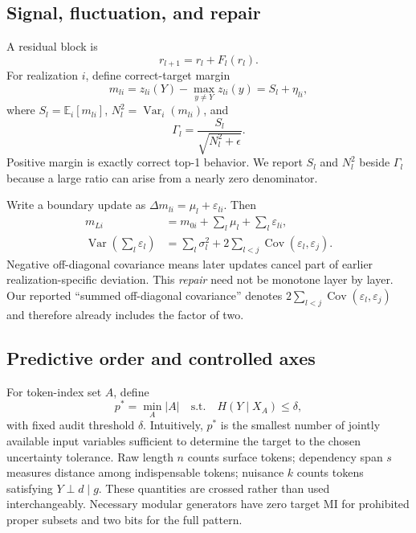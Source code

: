 \documentclass[10pt]{article}
\begin{document}
\subsection{Signal, fluctuation, and repair}
A residual block is
\begin{equation}r_{l+1}=r_l+F_l(r_l).
\end{equation}
For realization $i$, define correct-target margin
\begin{equation}m_{li}=z_{li}(Y)-\max_{y\ne Y}z_{li}(y)=S_l+\eta_{li},\end{equation}
where $S_l=\mathbb E_i[m_{li}]$, $N_l^2=\operatorname{Var}_i(m_{li})$, and
\begin{equation}\Gamma_l=\frac{S_l}{\sqrt{N_l^2+\epsilon}}.\end{equation}
Positive margin is exactly correct top-1 behavior. We report $S_l$ and $N_l^2$ beside $\Gamma_l$ because a large ratio can arise from a nearly zero denominator.

Write a boundary update as $\Delta m_{li}=\mu_l+\varepsilon_{li}$. Then
\begin{align}
m_{Li}&=m_{0i}+\sum_l\mu_l+\sum_l\varepsilon_{li},\\
\operatorname{Var}(\sum_l\varepsilon_l)&=\sum_l\sigma_l^2+2\sum_{l<j}\operatorname{Cov}(\varepsilon_l,\varepsilon_j).
\end{align}
Negative off-diagonal covariance means later updates cancel part of earlier realization-specific deviation. This \emph{repair} need not be monotone layer by layer. Our reported ``summed off-diagonal covariance'' denotes $2\sum_{l<j}\operatorname{Cov}(\varepsilon_l,\varepsilon_j)$ and therefore already includes the factor of two.

\subsection{Predictive order and controlled axes}
For token-index set $A$, define
\begin{equation}
p^*=\min_A |A|\quad\text{s.t.}\quad H(Y\mid X_A)\le\delta,
\end{equation}
with fixed audit threshold $\delta$. Intuitively, $p^*$ is the smallest number of jointly available input variables sufficient to determine the target to the chosen uncertainty tolerance. Raw length $n$ counts surface tokens; dependency span $s$ measures distance among indispensable tokens; nuisance $k$ counts tokens satisfying $Y\perp d\mid g$. These quantities are crossed rather than used interchangeably. Necessary modular generators have zero target MI for prohibited proper subsets and two bits for the full pattern.
\end{document}
